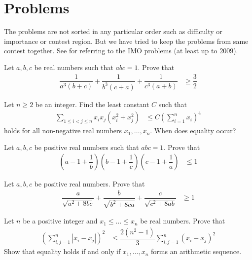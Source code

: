 \documentclass{subfile}
\begin{document}
	\chapter{Problems}\label{ch:problems}
	The problems are not sorted in any particular order such as difficulty or importance or contest region. But we have tried to keep the problems from same contest together. See \textcite{djukicc_jankovic_matic_2011} for referring to the IMO problems (at least up to $2009$).
		\begin{problem}
			Let $a,b,c$ be real numbers such that $abc=1$. Prove that
				\begin{align*}
					\dfrac{1}{a^{3}(b+c)}+\dfrac{1}{b^{3}(c+a)}+\dfrac{1}{c^{3}(a+b)}
						& \geq\dfrac{3}{2}
				\end{align*}
		\end{problem}
	
		\begin{problem}
			Let $n\geq2$ be an integer. Find the least constant $C$ such that
				\begin{align*}
					\sum_{1\leq i < j\leq n}x_{i}x_{j}(x_{i}^{2}+x_{j}^{2})
						& \leq C\left(\sum_{i=1}^{n}x_{i}\right)^{4}
				\end{align*}
			holds for all non-negative real numbers $x_{1},\ldots,x_{n}$. When does equality occur?
		\end{problem}
	
		\begin{problem}
			Let $a,b,c$ be positive real numbers such that $abc=1$. Prove that
				\begin{align*}
					\left(a-1+\dfrac{1}{b}\right)\left(b-1+\dfrac{1}{c}\right)\left(c-1+\dfrac{1}{a}\right)
						& \leq1
				\end{align*}
		\end{problem}
		
		\begin{problem}
			Let $a,b,c$ be positive real numbers. Prove that
				\begin{align*}
					\dfrac{a}{\sqrt{a^{2}+8bc}}+\dfrac{b}{\sqrt{b^{2}+8ca}}+\dfrac{c}{\sqrt{c^{2}+8ab}}
						& \geq1
				\end{align*}
		\end{problem}
		
		\begin{problem}
			Let $n$ be a positive integer and $x_{1}\leq\ldots\leq x_{n}$ be real numbers. Prove that
				\begin{align*}
					\left(\sum_{i,j=1}^{n}|x_{i}-x_{j}|\right)^{2}
						& \leq \dfrac{2(n^{2}-1)}{3}\sum_{i,j=1}^{n}(x_{i}-x_{j})^{2}
				\end{align*}
			Show that equality holds if and only if $x_{1},\ldots,x_{n}$ forms an arithmetic sequence.
		\end{problem}
	
\end{document}
